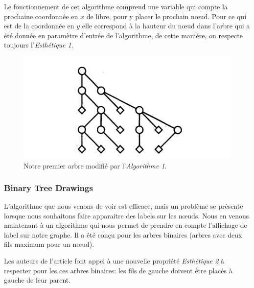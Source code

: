 \documentclass{article}
\begin{document}
    Le fonctionnement de cet algorithme comprend une variable qui compte la prochaine coordonnée en $x$ de libre, pour y placer le prochain n\oe{}ud. Pour ce qui est de la coordonnée en $y$ elle correspond à la hauteur du n\oe{}ud dans l'arbre qui a été donnée en paramètre d'entrée de l'algorithme, de cette manière, on respecte toujours l'\emph{Esthétique 1}.

    \vfill
    \begin{figure}[h]
    		\begin{center}
    			\includegraphics[scale=0.4]{arbreNaif.png}
    		\end{center}
    	\caption{Notre premier arbre modifié par l'\emph{Algorithme 1}. \cite{article79}}
      \label{fig:arbreNaif}
    \end{figure}
    \vfill

    \subsubsection{Binary Tree Drawings}

    L'algorithme que nous venons de voir est efficace, mais un problème se présente lorsque nous souhaitons faire apparaitre des labels sur les n\oe{}uds. Nous en venons maintenant à un algorithme qui nous permet de prendre en compte l'affichage de label sur notre graphe. Il a été conçu pour les arbres binaires (arbres avec deux fils maximum pour un n\oe{}ud).

    Les auteurs de l'article \cite{article79} font appel à une nouvelle propriété \emph{Esthétique 2} à respecter pour les ces arbres binaires: les fils de gauche doivent être placés à gauche de leur parent.
\end{document}
